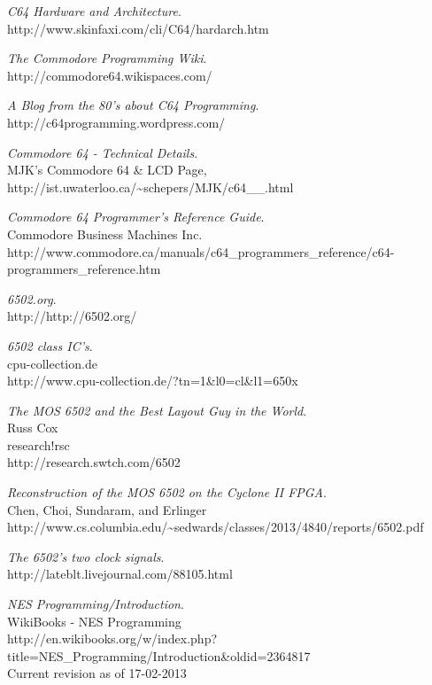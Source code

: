 \documentclass{article}
\begin{document}
\begin{thebibliography}{9}

  \emph{C64 Hardware and Architecture}.\\
  http://www.skinfaxi.com/cli/C64/hardarch.htm
  
  \emph{The Commodore Programming Wiki}.\\
  http://commodore64.wikispaces.com/
  
   \emph{A Blog from the 80's about C64 Programming}.\\
   http://c64programming.wordpress.com/

   \emph{Commodore 64 - Technical Details}.\\
   MJK's Commodore 64 \& LCD Page,
   http://ist.uwaterloo.ca/\textasciitilde{}schepers/MJK/c64\_\_.html
   
   \emph{Commodore 64 Programmer's Reference Guide}.\\
   Commodore Business Machines Inc.\\
   http://www.commodore.ca/manuals/c64\_programmers\_reference/c64-programmers\_reference.htm

   \emph{6502.org}.\\
   http://http://6502.org/

   \emph{6502 class IC's}.\\
   cpu-collection.de\\
   http://www.cpu-collection.de/?tn=1\&l0=cl\&l1=650x

   \emph{The MOS 6502 and the Best Layout Guy in the World}.\\
   Russ Cox\\
   research!rsc\\
   http://research.swtch.com/6502

   \emph{Reconstruction of the MOS 6502 on the Cyclone II FPGA}.\\
   Chen, Choi, Sundaram, and Erlinger\\
   http://www.cs.columbia.edu/\textasciitilde{}sedwards/classes/2013/4840/reports/6502.pdf

   \emph{The 6502's two clock signals}.\\
   http://lateblt.livejournal.com/88105.html

   \emph{NES Programming/Introduction}.\\
   WikiBooks - NES Programming\\
   http://en.wikibooks.org/w/index.php?title=NES\_Programming/Introduction\&oldid=2364817 \\
   Current revision as of 17-02-2013


\end{thebibliography}
\end{document}
